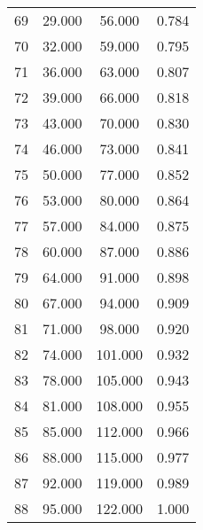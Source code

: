 \begin{tabular}{cccc}
  69 & 29.000 & 56.000 & 0.784 \\ 
  70 & 32.000 & 59.000 & 0.795 \\ 
  71 & 36.000 & 63.000 & 0.807 \\ 
  72 & 39.000 & 66.000 & 0.818 \\ 
  73 & 43.000 & 70.000 & 0.830 \\ 
  74 & 46.000 & 73.000 & 0.841 \\ 
  75 & 50.000 & 77.000 & 0.852 \\ 
  76 & 53.000 & 80.000 & 0.864 \\ 
  77 & 57.000 & 84.000 & 0.875 \\ 
  78 & 60.000 & 87.000 & 0.886 \\ 
  79 & 64.000 & 91.000 & 0.898 \\ 
  80 & 67.000 & 94.000 & 0.909 \\ 
  81 & 71.000 & 98.000 & 0.920 \\ 
  82 & 74.000 & 101.000 & 0.932 \\ 
  83 & 78.000 & 105.000 & 0.943 \\ 
  84 & 81.000 & 108.000 & 0.955 \\ 
  85 & 85.000 & 112.000 & 0.966 \\ 
  86 & 88.000 & 115.000 & 0.977 \\ 
  87 & 92.000 & 119.000 & 0.989 \\ 
  88 & 95.000 & 122.000 & 1.000 \\ 
   \hline
\end{tabular}
